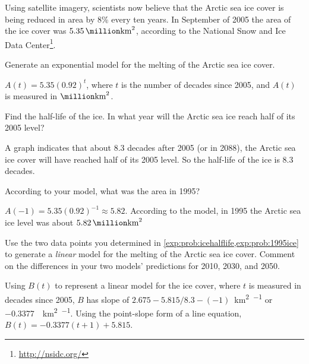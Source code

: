 \begin{problem}
Using satellite imagery, scientists now believe that the Arctic sea ice cover is being reduced in area by 8\% every ten years.  In September of 2005 the area of the ice cover was $\SI{5.35}{\million\kilo\meter\squared}$, according to the National Snow and Ice Data Center\footnote{\href{http://nsidc.org/}{http://nsidc.org/}}.  
\begin{subproblem}
	Generate an exponential model for the melting of the Arctic sea ice cover.\label{exp:prob:iceexpmodel}
	\begin{shortsolution}
		$A(t)=5.35(0.92)^t$, where $t$ is the number of decades since 2005, and $A(t)$ is measured in $\si{\million\kilo\meter\squared}$.
	\end{shortsolution}
\end{subproblem}
\begin{subproblem}
	Find the half-life of the ice.  In what year will the Arctic sea ice reach half of its 2005 level?\label{exp:prob:icehalflife}
	\begin{shortsolution}
		A graph indicates that about $8.3$ decades after 2005 (or in 2088), the Arctic sea ice cover will have reached half of its 2005 level. So the half-life of the ice is 8.3 decades.
	\end{shortsolution}
\end{subproblem}
\begin{subproblem}
	According to your model, what was the area in 1995?  \label{exp:prob:1995ice}
	\begin{shortsolution}
		$A(-1)=5.35(0.92)^{-1}\approx5.82$. According to the model, in 1995 the Arctic sea ice level was about $\SI{5.82}{\million\kilo\meter\squared}$
	\end{shortsolution}
\end{subproblem}
\begin{subproblem}
	Use the two data points you determined in \cref{exp:prob:icehalflife,exp:prob:1995ice} to generate a \emph{linear} model for the melting of the Arctic sea ice cover.  Comment on the differences in your two models' predictions for 2010, 2030, and 2050.    \label{exp:prob:icelinmodel}
							
	\begin{shortsolution}
		Using $B(t)$ to represent a linear model for the ice cover, where $t$ is measured in decades since 2005, $B$ has slope of $2.675-5.815/8.3-(-1)$\si{\million\kilo\meter\squared\per\decade}
		or \SI{-0.3377}{\million\kilo\meter\squared\per\decade}. Using the point-slope form of a line equation, $B(t)=-0.3377(t+1)+5.815$.
																

\end{shortsolution}
\end{subproblem}
\end{problem}
